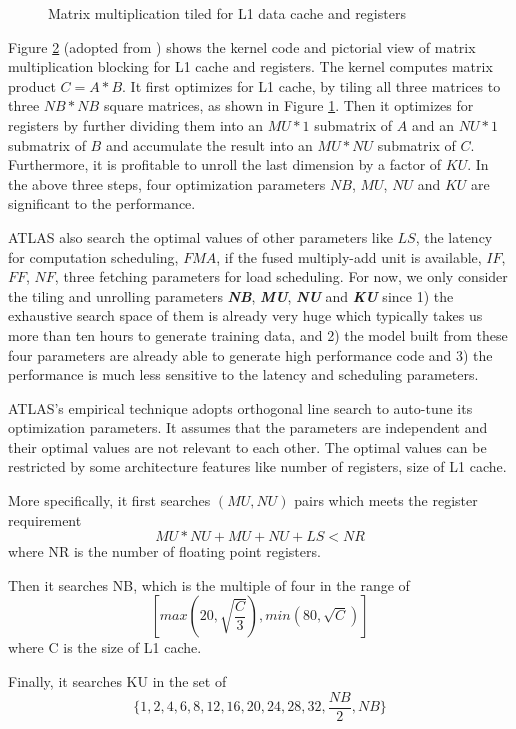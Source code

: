 \begin{figure}
\begin{subfigure}[t]{1.0\linewidth}
    \caption{}
    \label{fig:ATLAS_pic}
  \end{subfigure}
  \caption{Matrix multiplication tiled for L1 data cache and registers}
  \label{fig:ATLAS}
\end{figure}

  Figure \ref{fig:ATLAS} (adopted from \cite{yotov2005search}) shows the kernel code and pictorial view of matrix multiplication 
  blocking for L1 cache and registers. The kernel computes matrix product $C=A*B$. It first optimizes for L1 cache, by tiling all three matrices
  to three $NB*NB$ square matrices, as shown in Figure \ref{fig:ATLAS_pic}. Then it optimizes for registers by further dividing them  
  into an $MU*1$ submatrix of $A$ and an $NU*1$ submatrix of $B$ and accumulate the result into an $MU*NU$ submatrix of $C$. 
  Furthermore, it is profitable to unroll the last dimension by a factor of $KU$.
  In the above three steps, four optimization parameters $NB$, $MU$, $NU$ and $KU$ are significant to the performance. \par

  ATLAS also search the optimal values of other parameters like $LS$, the latency for computation scheduling, $FMA$, if the fused multiply-add unit is available, $IF$, $FF$, $NF$, three fetching parameters 
  for load scheduling. For now, we only consider the tiling and unrolling parameters \textbf{\textit{NB}}, \textbf{\textit{MU}}, \textbf{\textit{NU}} and \textbf{\textit{KU}} since 1) the exhaustive search space of them 
  is already very huge which typically takes us more than ten hours to generate training data, and 2) the model built from these four parameters are already able to
  generate high performance code and 3) the performance is much less sensitive to the latency and scheduling parameters.
  \par
  
  ATLAS's empirical technique adopts orthogonal line search to auto-tune its optimization parameters. 
  It assumes that the parameters are independent and their optimal values are not relevant to each other. The optimal values can be
  restricted by some architecture features like number of registers, size of L1 cache.\par
  More specifically, it first searches $(MU, NU)$ pairs which meets the register requirement
  \[ MU*NU + MU + NU + LS < NR \]
  where NR is the number of floating point registers.\par
  Then it searches NB, which is the multiple of four in the range of 
  \[ [max(20, \sqrt{\frac{C}{3}}), min(80, \sqrt{C}) ] \]
  where C is the size of L1 cache. 
  \par
  Finally, it searches KU in the set of 
  \[ \{1, 2, 4, 6, 8, 12, 16, 20, 24, 28, 32, \frac{NB}{2}, NB \} \]

